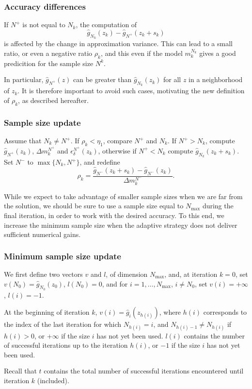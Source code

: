 \documentclass{beamer}
\begin{document}
\begin{frame}
\frametitle{Accuracy differences}

If $N^+$ is not equal to $N_k$, the computation of
\[
 \hat{g}_{N_k} (z_k) - \hat{g}_{N^+} ( z_k + s_k )
\]
is affected by the change in approximation variance.
This can lead to a small ratio, or even a negative ratio $\rho_k$, and this even if the model $m_k^{N_k}$ gives a good predicition for the sample size $N^k$.

\mbox{}

In particular, $\hat{g}_{N^+}(z)$ can be greater than $\hat{g}_{N_k}(z_k)$ for all $z$ in a neighborhood of $z_k$.
It is therefore important to avoid such cases, motivating the new definition of $\rho_k$, as described hereafter.

\end{frame}

\begin{frame}
\frametitle{Sample size update}

Assume that $N_k \ne N^+$.
If $\rho_k < \eta_1$, compare $N^+$ and $N_k$.
If $N^+ > N_k$, compute $\hat{g}_{N^+}(z_k)$, $\Delta m_k^{N^+}$ and
$\epsilon_{\delta}^{N^+}(z_k)$, otherwise if $N^+ < N_k$ compute $\hat{g}_{N_k}(z_k + s_k)$.
Set $N^-$ to $\max\lbrace N_k, N^+ \rbrace$, and redefine
\[
\rho_k = \frac{\hat{g}_{N^-}(z_k+s_k) - \hat{g}_{N^-}(z_k)}{\Delta
m_k^{N^-}}.
\]

\mbox{}

While we expect to take advantage of smaller sample sizes when we are far from the solution, we should be sure to use a sample size equal to $N_{\max}$ during the final iteration, in order to work with the desired accuracy.
To this end, we increase the minimum sample size when the adaptive strategy does not deliver sufficient numerical gains.

\end{frame}

\begin{frame}
\frametitle{Minimum sample size update}

We first define two vectors $v$ and $l$, of dimension $N_{\max}$, and, at iteration $k = 0$, set $v(N_0) = \hat{g}_{N_0}(z_0)$, $l(N_0) = 0$, and for $i =
1,\ldots,N_{\max}$, $i \ne N_0$, set $v(i) = +\infty$, $l(i) = -1$.

\mbox{}

At the beginning of iteration $k$, $v(i) = \hat{g}_i(z_{h(i)})$, where $h(i)$ corresponds to the index of the last iteration for which $N_{h(i)} = i$, and $N_{h(i)-1} \ne N_{h(i)}$ if $h(i) > 0$, or $+\infty$ if the size $i$ has not yet been used.
$l(i)$ contains the number of successful iterations up to the iteration $h(i)$, or $-1$ if the size $i$ has not yet been used.

\mbox{}

Recall that $t$ contains the total number of successful iterations encountered until iteration $k$ (included).

\end{frame}
\end{document}
